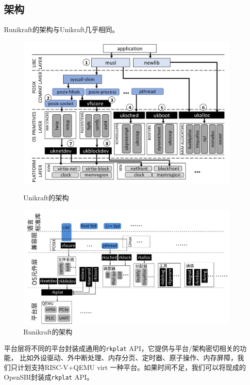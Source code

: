 \documentclass{../runikraft-report}
\begin{document}
\subsection{架构}
Runikraft的架构与Unikraft几乎相同。
\begin{figure}[!hbt]
\centering
\begin{minipage}{0.49\linewidth}
\centering
\includegraphics[width=\linewidth]{assets/Unikraft-architecture.png}
\caption{Unikraft的架构}\label{fig:unikraft-arch}
\end{minipage}
\begin{minipage}{0.49\linewidth}
\centering
\includegraphics[width=\linewidth]{assets/Runikraft-architecture.pdf}
\caption{Runikraft的架构}\label{fig:runikraft-arch}
\end{minipage}
\end{figure}
平台层将不同的平台封装成通用的\texttt{rkplat} API，它提供与平台/架构密切相关的功能，
比如外设驱动、外中断处理、内存分页、定时器、原子操作、内存屏障，我们只计划支持RISC-V+QEMU virt
一种平台。如果时间不足，我们可以将现成的OpenSBI\cite{5}\cite{6}封装成\texttt{rkplat} API。
\end{document}
